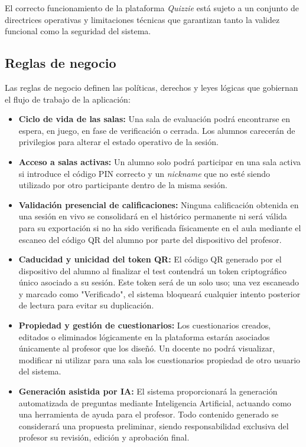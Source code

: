 El correcto funcionamiento de la plataforma \textit{Quizzie} está sujeto a un conjunto de directrices operativas y limitaciones técnicas que garantizan tanto la validez funcional como la seguridad del sistema. 

\subsection{Reglas de negocio}\label{sec:reglas_de_negocio}

Las reglas de negocio definen las políticas, derechos y leyes lógicas que gobiernan el flujo de trabajo de la aplicación:

\begin{itemize}
    \item \textbf{Ciclo de vida de las salas:} Una sala de evaluación podrá encontrarse en espera, en juego, en fase de verificación o cerrada. Los alumnos carecerán de privilegios para alterar el estado operativo de la sesión.
    \item \textbf{Acceso a salas activas:} Un alumno solo podrá participar en una sala activa si introduce el código PIN correcto y un \textit{nickname} que no esté siendo utilizado por otro participante dentro de la misma sesión.
    \item \textbf{Validación presencial de calificaciones:} Ninguna calificación obtenida en una sesión en vivo se consolidará en el histórico permanente ni será válida para su exportación si no ha sido verificada físicamente en el aula mediante el escaneo del código QR del alumno por parte del dispositivo del profesor.
    \item \textbf{Caducidad y unicidad del token QR:} El código QR generado por el dispositivo del alumno al finalizar el test contendrá un token criptográfico único asociado a su sesión. Este token será de un solo uso; una vez escaneado y marcado como "Verificado", el sistema bloqueará cualquier intento posterior de lectura para evitar su duplicación.
    \item \textbf{Propiedad y gestión de cuestionarios:} Los cuestionarios creados, editados o eliminados lógicamente en la plataforma estarán asociados únicamente al profesor que los diseñó. Un docente no podrá visualizar, modificar ni utilizar para una sala los cuestionarios propiedad de otro usuario del sistema.
    \item \textbf{Generación asistida por IA:} El sistema proporcionará la generación automatizada de preguntas mediante Inteligencia Artificial, actuando como una herramienta de ayuda para el profesor. Todo contenido generado se considerará una propuesta preliminar, siendo responsabilidad exclusiva del profesor su revisión, edición y aprobación final.

\end{itemize}
